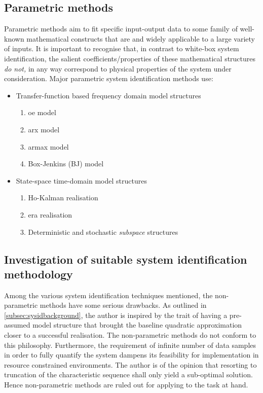 \subsection{Parametric methods}\label{subsec:parametric}
Parametric  methods aim  to fit  specific input-output  data to  some family  of
well-known mathematical  constructs that  are and widely  applicable to  a large
variety of inputs.  It is important to recognise that,  in contrast to white-box
system identification, the salient coefficients/properties of these mathematical
structures \emph{do  not,} in any way  correspond to physical properties  of the
system under consideration. Major parametric system identification methods use:
\begin{itemize}
    \item Transfer-function based frequency domain model structures
        \begin{enumerate}
            \item \gls{oe} model
            \item \gls{arx} model
            \item \gls{armax} model
            \item Box-Jenkins (BJ) model
        \end{enumerate}
    \item State-space time-domain model structures
        \begin{enumerate}
            \item Ho-Kalman realisation
            \item \gls{era} realisation
            \item Deterministic and stochastic \emph{subspace} structures
        \end{enumerate}
\end{itemize}

\subsection{Investigation of suitable system identification methodology}\label{subsec:suitablesysid}
Among   the   various   system    identification   techniques   mentioned,   the
non-parametric   methods    have   some    serious   drawbacks.    As   outlined
in \cref{subsec:sysidbackground}, the author is inspired  by the trait of having
a pre-assumed model structure that  brought the baseline quadratic approximation
closer to a successful realisation. The non-parametric methods do not conform to
this philosophy. Furthermore, the requirement of infinite number of data samples
in order to fully quantify the system dampens its feasibility for implementation
in  resource  constrained  environments.  The  author is  of  the  opinion  that
resorting  to truncation  of  the  characteristic sequence  shall  only yield  a
sub-optimal solution. Hence non-parametric methods are ruled out for applying to
the task at hand.


